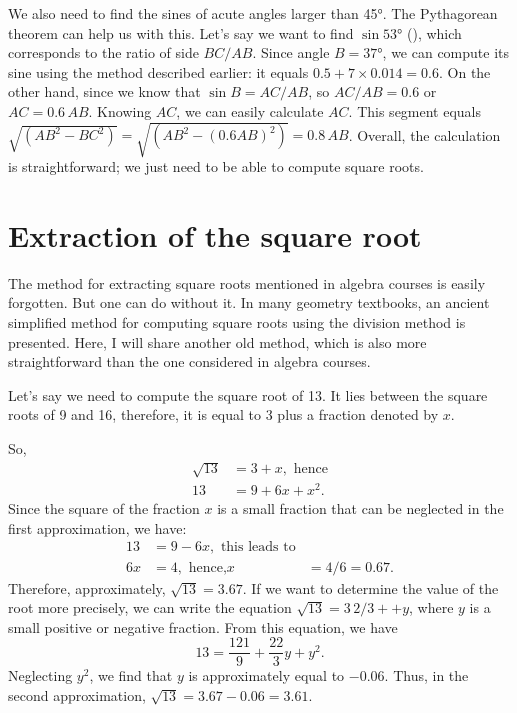 We also need to find the sines of acute angles larger than \ang{45}. The Pythagorean theorem can help us with this. Let's say we want to find $\sin \ang{53}$ (), which corresponds to the ratio of side $BC/AB$. Since angle $B = \ang{37}$, we can compute its sine using the method described earlier: it equals $0.5 + 7 \times 0.014 = 0.6$. On the other hand, since we know that $\sin B = AC/ AB$, so $AC/AB = 0.6$ or $AC = 0.6 \, AB$. Knowing $AC$, we can easily calculate $AC$. This segment equals $\sqrt{(AB^{2} - BC^{2})} = \sqrt{(AB^{2} - (0.6AB)^{2})} = 0.8\, AB$. Overall, the calculation is straightforward; we just need to be able to compute square roots.


\section{Extraction of the square root}
\label{sec-5.2}

The method for extracting square roots mentioned in algebra courses is easily forgotten. But one can do without it. In many geometry textbooks, an ancient simplified method for computing square roots using the division method is presented. Here, I will share another old method, which is also more straightforward than the one considered in algebra courses.

Let's say we need to compute the square root of 13. It lies between the square roots of 9 and 16, therefore, it is equal to 3 plus a fraction denoted by $x$.

So,
\begin{align*}%
\sqrt{13} & = 3 + x, \,\, \text{hence} \\
13 & = 9 + 6x + x^{2}.
\end{align*}
Since the square of the fraction $x$ is a small fraction that can be neglected in the first approximation, we have:
\begin{align*}%
13 &= 9 - 6x, \,\, \text{this leads to} \\
6x & = 4,\,\, \text{hence,}
x & = 4/6 = 0.67.
\end{align*}
Therefore, approximately, $\sqrt{13} = 3.67$. If we want to determine the value of the root more precisely, we can write the equation $\sqrt{13} = 3 \, 2/3+ + y$, where $y$ is a small positive or negative fraction. From this equation, we have
\begin{equation*}%
13 = \frac{121}{9}  + \frac{22}{3} y  + y^{2}.
\end{equation*}
Neglecting $y^{2}$, we find that $y$ is approximately equal to $-0.06$. Thus, in the second approximation, $\sqrt{13} = 3.67 - 0.06 = 3.61.$

